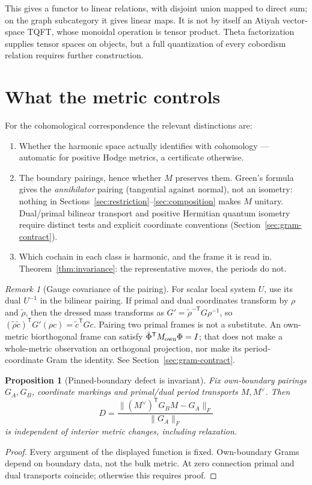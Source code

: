 \documentclass[11pt]{article}
\newtheorem{proposition}[theorem]{Proposition}
\theoremstyle{definition}
\theoremstyle{remark}
\newtheorem{remark}[theorem]{Remark}
\begin{document}
This gives a functor to linear relations, with disjoint union mapped to
direct sum; on the graph subcategory it gives linear maps. It is not by
itself an Atiyah vector-space TQFT, whose monoidal operation is tensor
product. Theta factorization supplies tensor spaces on objects, but a full
quantization of every cobordism relation requires further construction.

\section{What the metric controls}\label{sec:metric}

For the cohomological correspondence the relevant distinctions are:

\begin{enumerate}[nosep]
  \item Whether the harmonic space actually identifies with cohomology
    --- automatic for positive Hodge metrics, a certificate otherwise.
  \item The boundary pairings, hence whether $M$ preserves them. Green's
    formula gives the \emph{annihilator} pairing (tangential against normal),
    not an isometry: nothing in Sections~\ref{sec:restriction}--\ref{sec:composition}
    makes $M$ unitary. Dual/primal bilinear transport and positive Hermitian
    quantum isometry require distinct tests and explicit coordinate conventions
    (Section~\ref{sec:gram-contract}).
  \item Which cochain in each class is harmonic, and the frame it is read
    in. Theorem~\ref{thm:invariance}: the representative moves, the periods
    do not.
\end{enumerate}

\begin{remark}[Gauge covariance of the pairing]\label{rem:gauge}
For scalar local system $U$, use its dual $U^{-1}$ in the bilinear pairing.
If primal and dual coordinates transform by $\rho$ and $\tilde\rho$, then
the dressed mass transforms as
$G' = \tilde\rho^{-\mathsf T}G\rho^{-1}$, so
$(\tilde\rho\tilde c)^{\mathsf T}G'(\rho c)=\tilde c^{\mathsf T}Gc$.
Pairing two primal frames is not a substitute. An own-metric biorthogonal
frame can satisfy $\tilde\Phi^{\mathsf T}M_{\rm own}\Phi=I$; that does not
make a whole-metric observation an orthogonal projection, nor make its
period-coordinate Gram the identity. See Section~\ref{sec:gram-contract}.
\end{remark}

\begin{proposition}[Pinned-boundary defect is invariant]\label{prop:pinned-defect}
Fix own-boundary pairings $G_A,G_B$, coordinate markings and primal/dual
period transports $M,M^\vee$. Then
\[
 D=\frac{\|(M^\vee)^{\mathsf T}G_BM-G_A\|_F}{\|G_A\|_F}
\]
is independent of interior metric changes, including relaxation.
\end{proposition}
\begin{proof}
Every argument of the displayed function is fixed. Own-boundary Grams
depend on boundary data, not the bulk metric. At zero connection primal
and dual transports coincide; otherwise this requires proof.
\end{proof}
\end{document}
